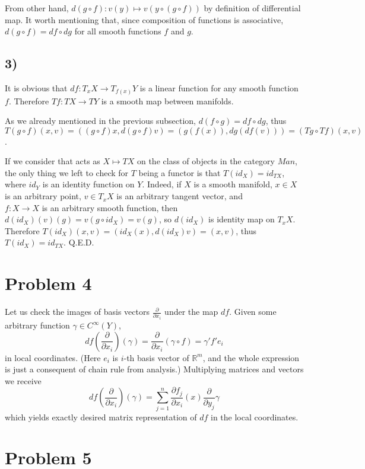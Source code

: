 \documentclass{article}[14pt]
\begin{document}
From other hand, $d(g \circ f): v(y) \mapsto v(y \circ (g \circ f))$ by definition of differential map.
It worth mentioning that, since composition of functions is associative, $d(g \circ f) = df \circ dg$ for all smooth functions $f$ and $g$.

\subsection{3)}

It is obvious that $df: T_x X \rightarrow T_{f(x)}Y$ is a linear function for any smooth function $f$.
Therefore $Tf: TX \rightarrow TY$ is a smooth map between manifolds.

As we already mentioned in the previous subsection, $d(f \circ g) = df \circ dg$,
thus $T(g \circ f)(x, v) = ((g \circ f)x, d(g \circ f)v) = (g(f(x)), dg(df(v))) = (Tg \circ Tf)(x, v)$.

If we consider that acts as $X \mapsto TX$ on the class of objects in the category $Man$, the only thing we left to check for $T$ being a functor is that $T(id_{X}) = id_{TX}$,
where $id_Y$ is an identity function on $Y$.
Indeed, if $X$ is a smooth manifold, $x \in X$ is an arbitrary point, $v \in T_x X$ is an arbitrary tangent vector, and \\ $f: X \rightarrow X$ is an arbitrary smooth function,
then $d(id_X)(v)(g) = v(g \circ id_X) = v(g)$, so $d(id_X)$ is identity map on $T_x X$.
Therefore $T (id_X) (x, v) = (id_X (x), d(id_X)v) = (x, v)$, thus $T (id_X) = id_{TX}$. Q.E.D.

\section{Problem 4}

Let us check the images of basis vectors $\frac{\partial}{\partial x_i}$ under the map $df$.
Given some arbitrary function $\gamma \in C^\infty (Y)$, 
$$df(\frac{\partial}{\partial x_i})(\gamma) = \frac{\partial}{\partial x_i} (\gamma \circ f) = \gamma' f' e_i$$ in local coordinates.
(Here $e_i$ is $i$-th basis vector of $\mathbb R^m$, and the whole expression is just a consequent of chain rule from analysis.)
Multiplying matrices and vectors we receive 
$$df(\frac{\partial}{\partial x_i})(\gamma) = \sum_{j=1}^n \frac{\partial f_j}{\partial x_i}(x) \frac{\partial}{\partial y_j}\gamma$$
which yields exactly desired matrix representation of $df$ in the local coordinates.

\section{Problem 5}
\end{document}

